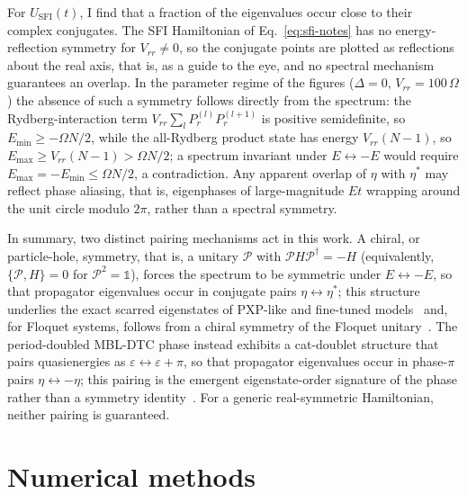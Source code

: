 \documentclass[longbibliography]{revtex4-2}
\begin{document}
For \(U_{\mathrm{SFI}}(t)\), I find that a fraction of the eigenvalues
occur close to their complex conjugates. The SFI Hamiltonian of
Eq.~\eqref{eq:sfi-notes} has no energy-reflection symmetry for
\(V_{rr} \neq 0\), so the conjugate points are plotted as reflections
about the real axis, that is, as a guide to the eye, and no spectral
mechanism guarantees an overlap. In the parameter regime of the figures
(\(\Delta = 0\), \(V_{rr} = 100\,\Omega\)) the absence of such a
symmetry follows directly from the spectrum: the Rydberg-interaction
term \(V_{rr} \sum_{l} P_{r}^{(l)} P_{r}^{(l+1)}\) is positive
semidefinite, so \(E_{\min} \geq -\Omega N / 2\), while the all-Rydberg
product state has energy \(V_{rr} (N-1)\), so
\(E_{\max} \geq V_{rr} (N-1) > \Omega N / 2\); a spectrum invariant
under \(E \leftrightarrow -E\) would require
\(E_{\max} = -E_{\min} \leq \Omega N / 2\), a contradiction. Any
apparent overlap of \(\eta\) with \(\eta^*\) may reflect phase
aliasing, that is, eigenphases of large-magnitude \(E t\) wrapping
around the unit circle modulo \(2\pi\), rather than a spectral
symmetry.

In summary, two distinct pairing mechanisms act in this work. A chiral,
or particle-hole, symmetry, that is, a unitary \(\mathcal{P}\) with
\(\mathcal{P} H \mathcal{P}^{\dagger} = -H\) (equivalently,
\(\{\mathcal{P}, H\} = 0\) for \(\mathcal{P}^2 = \mathbb{1}\)), forces
the spectrum to be symmetric under \(E \leftrightarrow -E\), so that
propagator eigenvalues occur in
conjugate pairs \(\eta \leftrightarrow \eta^*\); this structure
underlies the exact scarred eigenstates of PXP-like and fine-tuned
models~\cite{turner2018weak, lin2019exact, choi2019emergent} and, for
Floquet systems, follows from a chiral symmetry of the Floquet
unitary~\cite{mizuta2020exact}. The period-doubled MBL-DTC phase
instead exhibits a cat-doublet structure that pairs quasienergies as
\(\varepsilon \leftrightarrow \varepsilon + \pi\), so that propagator
eigenvalues occur in phase-\(\pi\) pairs
\(\eta \leftrightarrow -\eta\); this pairing is the emergent
eigenstate-order signature of the phase rather than a symmetry
identity~\cite{khemani2016phase, else2016floquet}. For a generic
real-symmetric Hamiltonian, neither pairing is guaranteed.



\section{Numerical methods}\label{sec:numerical-methods}
\end{document}
